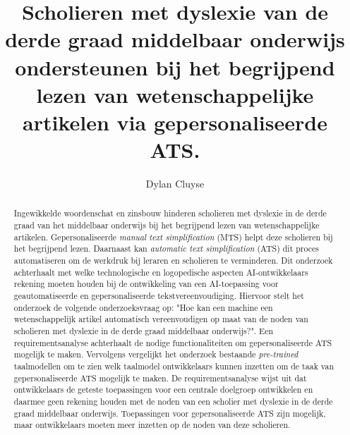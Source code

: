 \documentclass[a0,portrait]{hogent-poster}
\title{\Huge Scholieren met dyslexie van de derde graad middelbaar onderwijs ondersteunen bij het begrijpend lezen van wetenschappelijke artikelen via gepersonaliseerde ATS.}
\subtitle{}
\author{Dylan Cluyse}
\begin{document}
\maketitle

\begin{abstract}
Ingewikkelde woordenschat en zinsbouw hinderen scholieren met dyslexie in de derde graad van het middelbaar onderwijs bij het begrijpend lezen van wetenschappelijke artikelen. Gepersonaliseerde \textit{manual text simplification} (MTS) helpt deze scholieren bij het begrijpend lezen. Daarnaast kan \textit{automatic text simplification} (ATS) dit proces automatiseren om de werkdruk bij leraren en scholieren te verminderen. Dit onderzoek achterhaalt met welke technologische en logopedische aspecten AI-ontwikkelaars rekening moeten houden bij de ontwikkeling van een AI-toepassing voor geautomatiseerde en gepersonaliseerde tekstvereenvoudiging. Hiervoor stelt het onderzoek de volgende onderzoeksvraag op: "Hoe kan een machine een wetenschappelijk artikel automatisch vereenvoudigen op maat van de noden van scholieren met dyslexie in de derde graad middelbaar onderwijs?". Een requirementsanalyse achterhaalt de nodige functionaliteiten om gepersonaliseerde ATS mogelijk te maken. Vervolgens vergelijkt het onderzoek bestaande \textit{pre-trained} taalmodellen om te zien welk taalmodel ontwikkelaars kunnen inzetten om de taak van gepersonaliseerde ATS mogelijk te maken. De requirementsanalyse wijst uit dat ontwikkelaars de geteste toepassingen voor een centrale doelgroep ontwikkelen en daarmee geen rekening houden met de noden van een scholier met dyslexie in de derde graad middelbaar onderwijs. Toepassingen voor gepersonaliseerde ATS zijn mogelijk, maar ontwikkelaars moeten meer inzetten op de noden van deze scholieren.
\end{abstract}
\end{document}
